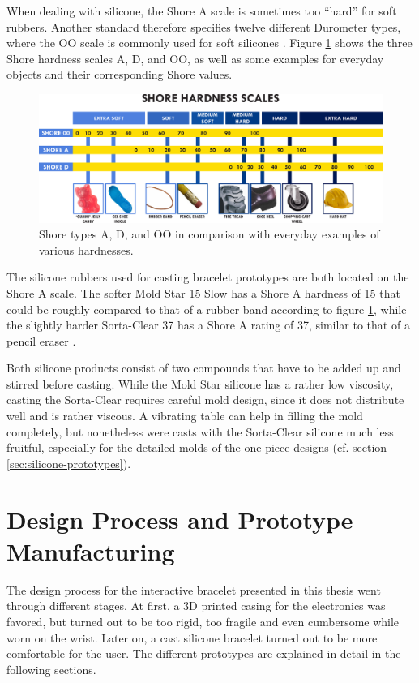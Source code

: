 When dealing with silicone, the Shore A scale is sometimes too ``hard'' for soft rubbers. Another standard therefore specifies twelve different Durometer types, where the OO scale is commonly used for soft silicones \cite{ISO7619}. Figure \ref{fig:shore} shows the three Shore hardness scales A, D, and OO, as well as some examples for everyday objects and their corresponding Shore values.

\begin{figure}[bth]
	\includegraphics[width=\linewidth]{gfx/durometer_without_logo.pdf}
	\caption[Shore hardness scales and everyday examples]{Shore types A, D, and OO in comparison with everyday examples of various hardnesses. \cite{smoothon-web}}\label{fig:shore}
\end{figure}

The silicone rubbers used for casting bracelet prototypes are both located on the Shore A scale. The softer Mold Star 15 Slow has a Shore A hardness of 15 that could be roughly compared to that of a rubber band according to figure \ref{fig:shore}, while the slightly harder Sorta-Clear 37 has a Shore A rating of 37, similar to that of a pencil eraser \cite{moldstar} \cite{sortaclear}.

Both silicone products consist of two compounds that have to be added up and stirred before casting. While the Mold Star silicone has a rather low viscosity, casting the Sorta-Clear requires careful mold design, since it does not distribute well and is rather viscous. A vibrating table can help in filling the mold completely, but nonetheless were casts with the Sorta-Clear silicone much less fruitful, especially for the detailed molds of the one-piece designs (cf. section \ref{sec:silicone-prototypes}).

\section{Design Process and Prototype Manufacturing}

The design process for the interactive bracelet presented in this thesis went through different stages. At first, a 3D printed casing for the electronics was favored, but turned out to be too rigid, too fragile and even cumbersome while worn on the wrist. Later on, a cast silicone bracelet turned out to be more comfortable for the user. The different prototypes are explained in detail in the following sections.

